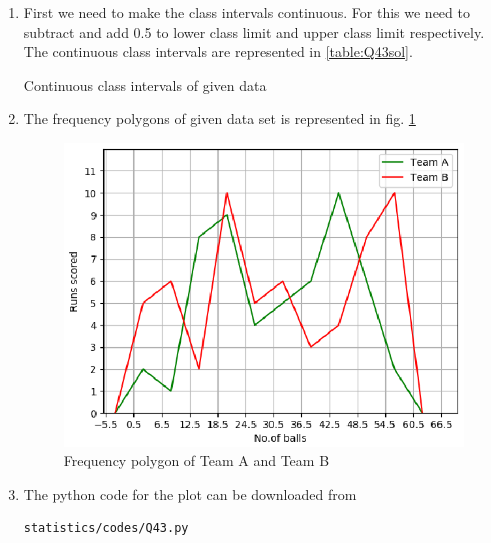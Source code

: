 \renewcommand{\theequation}{\theenumi}
\begin{enumerate}[label=\thesection.\arabic*.,ref=\thesection.\theenumi]
\item First we need to make the class intervals continuous. For this we need to subtract and add 0.5 to lower class limit and upper class limit respectively. The continuous class intervals are represented in \ref{table:Q43sol}.
\begin{table}[!ht]
\centering

\caption{Continuous class intervals of given data}
\label{table:Q43sol}	
\end{table}
\item The frequency polygons of given data set is represented in fig. \ref{fig:freqpoly2}
\begin{figure}[!ht]
\centering
\includegraphics[width= \columnwidth]{./statistics/figs/Q43.eps}
\caption{Frequency polygon of Team A and Team B}
\label{fig:freqpoly2}
\end{figure}
\item The python code for the plot can be downloaded from
\begin{lstlisting}
statistics/codes/Q43.py
\end{lstlisting}

\end{enumerate}
